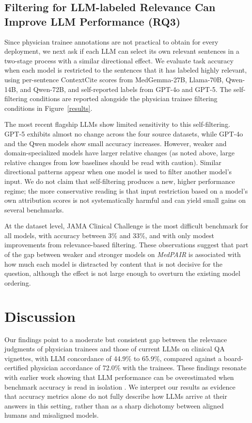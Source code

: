 \documentclass[fleqn,10pt]{wlscirep}
\begin{document}
\subsection{Filtering for LLM-labeled Relevance Can Improve LLM Performance (RQ3)}
Since physician trainee annotations are not practical to obtain for every deployment, we next ask if each LLM can select its own relevant sentences in a two-stage process with a similar directional effect. We evaluate task accuracy when each model is restricted to the sentences that it has labeled highly relevant, using per-sentence ContextCite scores from MedGemma-27B, Llama-70B, Qwen-14B, and Qwen-72B, and self-reported labels from GPT-4o and GPT-5. The self-filtering conditions are reported alongside the physician trainee filtering conditions in Figure~\ref{results}.

The most recent flagship LLMs show limited sensitivity to this self-filtering. GPT-5 exhibits almost no change across the four source datasets, while GPT-4o and the Qwen models show small accuracy increases. However, weaker and domain-specialized models have larger relative changes (as noted above, large relative changes from low baselines should be read with caution). Similar directional patterns appear when one model is used to filter another model's input. We do not claim that self-filtering produces a new, higher performance regime; the more conservative reading is that input restriction based on a model's own attribution scores is not systematically harmful and can yield small gains on several benchmarks.

At the dataset level, JAMA Clinical Challenge is the most difficult benchmark for all models, with accuracy between 3\% and 33\%, and with only modest improvements from relevance-based filtering. These observations suggest that part of the gap between weaker and stronger models on \emph{MedPAIR} is associated with how much each model is distracted by content that is not decisive for the question, although the effect is not large enough to overturn the existing model ordering.

\section{Discussion}

Our findings point to a moderate but consistent gap between the relevance judgments of physician trainees and those of current LLMs on clinical QA vignettes, with LLM concordance of 44.9\% to 65.9\%, compared against a board-certified physician accordance of 72.0\% with the trainees. These findings resonate with earlier work showing that LLM performance can be overestimated when benchmark accuracy is read in isolation \cite{bao_llms_2024, ishii_analysis_2024, de2024text}. We interpret our results as evidence that accuracy metrics alone do not fully describe how LLMs arrive at their answers in this setting, rather than as a sharp dichotomy between aligned humans and misaligned models.
\end{document}
